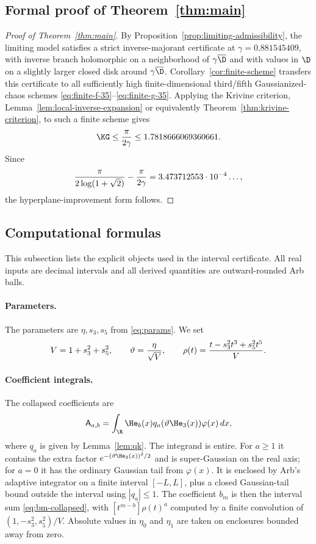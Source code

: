 \subsection{Formal proof of Theorem~\ref{thm:main}}\label{subsec:formal-proof-main}

\begin{proof}[Proof of Theorem~\ref{thm:main}]
By Proposition~\ref{prop:limiting-admissibility}, the limiting model satisfies a strict inverse-majorant certificate at $\gamma=0.881545409$, with inverse branch holomorphic on a neighborhood of $\gamma\overline\D$ and with values in $\D$ on a slightly larger closed disk around $\gamma\overline\D$.  Corollary~\ref{cor:finite-scheme} transfers this certificate to all sufficiently high finite-dimensional third/fifth Gaussianized-chaos schemes \eqref{eq:finite-f-35}--\eqref{eq:finite-g-35}.  Applying the Krivine criterion, Lemma~\ref{lem:local-inverse-expansion} or equivalently Theorem~\ref{thm:krivine-criterion}, to such a finite scheme gives
\[
  \KG\le {\pi\over2\gamma}\le1.7818666069360661.
\]
Since
\[
  {\pi\over 2\log(1+\sqrt2)}-{\pi\over2\gamma}
  =3.473712553\cdot10^{-4}\ldots,
\]
the hyperplane-improvement form follows.
\end{proof}



\subsection{Computational formulas}\label{sec:formulas}

This subsection lists the explicit objects used in the interval certificate.  All real inputs are decimal intervals and all derived quantities are outward-rounded Arb balls.

\paragraph{Parameters.}
The parameters are $\eta,s_3,s_5$ from \eqref{eq:params}.  We set
\[
  V=1+s_3^2+s_5^2,
  \qquad
  \vartheta={\eta\over\sqrt V},
  \qquad
  \rho(t)={t-s_3^2t^3+s_5^2t^5\over V}.
\]

\paragraph{Coefficient integrals.}
The collapsed coefficients are
\[
  \mathsf A_{a,b}=\int_\R \He_b(x)q_a(\vartheta\He_3(x))\varphi(x)\,dx,
\]
where $q_a$ is given by Lemma~\ref{lem:qk}.  The integrand is entire.  For $a\ge1$ it contains the extra factor $e^{-(\vartheta\He_3(x))^2/2}$ and is super-Gaussian on the real axis; for $a=0$ it has the ordinary Gaussian tail from $\varphi(x)$.  It is enclosed by Arb's adaptive integrator on a finite interval $[-L,L]$, plus a closed Gaussian-tail bound outside the interval using $|q_a|\le1$.  The coefficient $b_m$ is then the interval sum \eqref{eq:bm-collapsed}, with $[t^{m-b}]\rho(t)^a$ computed by a finite convolution of $(1,-s_3^2,s_5^2)/V$.  Absolute values in $\eta_0$ and $\eta_1$ are taken on enclosures bounded away from zero.

